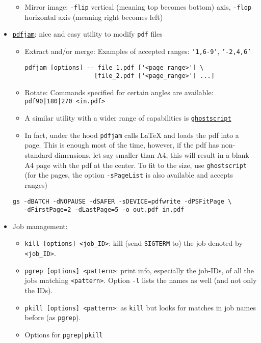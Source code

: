 \documentclass[a4paper,12pt,%
              final%
              ]{article}
\begin{document}
\begin{itemize}
\begin{itemize}
      \item Mirror image: \verb|-flip| vertical (meaning top becomes bottom) axis, \verb|-flop| horizontal axis (meaning right becomes left)
    \end{itemize}
  \item \href{https://github.com/DavidFirth/pdfjam#using}{\texttt{pdfjam}}: nice and easy utility to modify \texttt{pdf} files
    \begin{itemize}
      \item Extract and/or merge: Examples of accepted ranges: \texttt{'1,6-9'}, \texttt{'-2,4,6'}
\begin{verbatim}
pdfjam [options] -- file_1.pdf ['<page_range>'] \
                   [file_2.pdf ['<page_range>'] ...]
\end{verbatim}
      \item Rotate: Commands specified for certain angles are available: \verb!pdf90|180|270 <in.pdf>!
      \item A similar utility with a wider range of capabilities is \href{https://www.ghostscript.com/doc/current/Use.htm}{\texttt{ghostscript}}
      \item In fact, under the hood \texttt{pdfjam} calls \LaTeX{} and loads the pdf into a page. This is enough most of the time, however, if the pdf has non-standard dimensions, let say smaller than A4, this will result in a blank A4 page with the pdf at the center. To fit to the size, use \texttt{ghostscript} (for the pages, the option \texttt{-sPageList} is also available and accepts ranges)
    \end{itemize}
\begin{verbatim}
gs -dBATCH -dNOPAUSE -dSAFER -sDEVICE=pdfwrite -dPSFitPage \
   -dFirstPage=2 -dLastPage=5 -o out.pdf in.pdf
\end{verbatim}
  \item Job management:
    \begin{itemize}
      \item \verb|kill [options] <job_ID>|: kill (send \texttt{SIGTERM} to) the job denoted by \verb|<job_ID>|.
      \item \verb|pgrep [options] <pattern>|: print info, especially the job-IDs, of all the jobs matching \verb|<pattern>|. Option \verb|-l| lists the names as well (and not only the IDs).
      \item \verb|pkill [options] <pattern>|: as \verb|kill| but looks for matches in job names before (as \verb|pgrep|).
      \item Options for \verb!pgrep|pkill!

\end{itemize}
\end{itemize}
\end{document}

